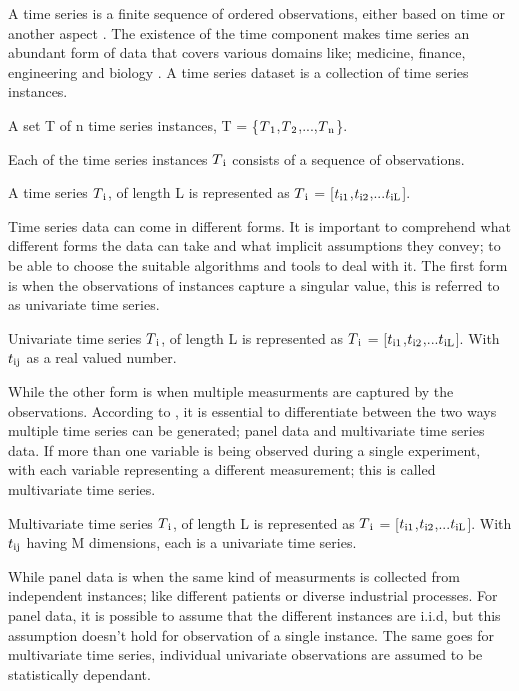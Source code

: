 A time series is a finite sequence of ordered observations, either based on time or another aspect \cite{abanda2019review,bagnall2017great}.
The existence of the time component makes time series an abundant form of data that covers various domains like; medicine, finance, engineering and biology \cite{lines2018time}.
A time series dataset is a collection of time series instances.
\begin{definition}
A set T of n time series instances, T = \{$T\textsubscript{1}$,$T\textsubscript{2}$,...,$T\textsubscript{n}$\}.
\end{definition}
Each of the time series instances $T\textsubscript{i}$ consists of a sequence of observations.
\begin{definition}
A time series $T\textsubscript{i}$, of length L is represented as $T\textsubscript{i}$ = [$t\textsubscript{i1}$,$t\textsubscript{i2}$,...$t\textsubscript{iL}$].
\end{definition}
Time series data can come in different forms. It is important to comprehend what different forms the data can take and what implicit assumptions they convey; to be able to choose the suitable algorithms and tools to deal with it.\newline
The first form is when the observations of instances capture a singular value, this is referred to as univariate time series.
\begin{definition}
Univariate time series $T\textsubscript{i}$, of length L is represented as 
$T\textsubscript{i}$ = [$t\textsubscript{i1}$,$t\textsubscript{i2}$,...$t\textsubscript{iL}$].
With $t\textsubscript{ij}$ as a real valued number.
\end{definition}
While the other form is when multiple measurments are captured by the observations.
According to \cite{loning2019sktime}, it is essential to differentiate between the two ways multiple time series can be generated; panel data and multivariate time series data.\newline
If more than one variable is being observed during a single experiment, with each variable representing a different measurement; this is called multivariate time series.
\begin{definition}
Multivariate time series $T\textsubscript{i}$, of length L is represented as $T\textsubscript{i}$ = [$t\textsubscript{i1}$,$t\textsubscript{i2}$,...$t\textsubscript{iL}$]. With $t\textsubscript{ij}$ having M dimensions, each is a univariate time series.
\end{definition}
While panel data is when the same kind of measurments is collected from independent instances; like different patients or diverse industrial processes.\newline
For panel data, it is possible to assume that the different instances are i.i.d, but this assumption doesn't hold for observation of a single instance.
The same goes for multivariate time series, individual univariate observations are assumed to be statistically dependant.
